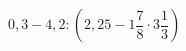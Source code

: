 \begin{ex}[type=calculate]
	\begin{condition}
		\( 0,3-4,2:\left( 2,25-1\dfrac{7}{8}\cdot3\dfrac{1}{3} \right) \)
	\end{condition}
\end{ex}
